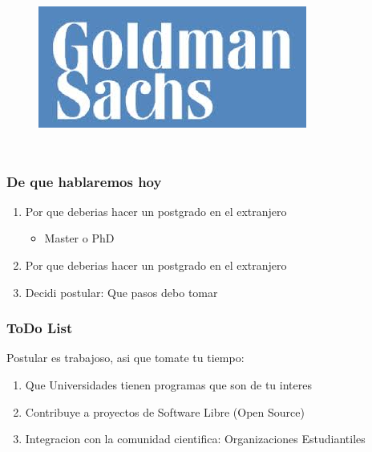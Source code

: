 \documentclass[10pt]{beamer}
\begin{document}
\begin{frame}
\begin{columns}[t]
\begin{figure}[h]
	          \label{fig:MicrosoftLogo}
	          \includegraphics[scale=0.15]{figures/Goldman_Logo.jpg} 	
	          \label{fig:GoldmanLogo}
            \label{fig:Universidades}
	\end{figure} 
\end{columns}

\end{frame}

\begin{frame}
\frametitle{De que hablaremos hoy}
\begin{enumerate}
\item{Por que deberias hacer un postgrado en el extranjero
	\begin{itemize}
		\item{Master o PhD}
	\end{itemize}
}
\item{Por que {\color{magenta}{NO}} deberias hacer un postgrado en el extranjero}
\item{ Decidi postular: Que pasos debo tomar}
\end{enumerate}

\end{frame}

\begin{frame}
\frametitle{ToDo List}
Postular es {\color{magenta}trabajoso}, asi que tomate tu tiempo:
\begin{enumerate}
\item{Que Universidades tienen programas que son de tu interes}
\item{Contribuye a proyectos de Software Libre (Open Source)}
\item{Integracion con la comunidad cientifica: Organizaciones Estudiantiles}
\end{enumerate}

\end{frame}
\end{document}
